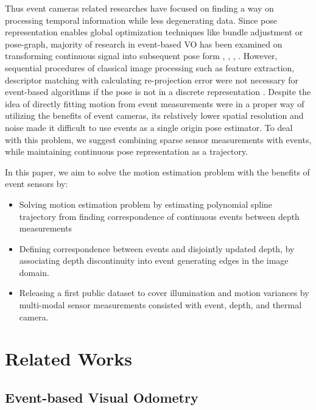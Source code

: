 Thus event cameras related researches have focused on finding a way on processing temporal information while less degenerating data. Since pose representation enables global optimization techniques like bundle adjustment or pose-graph, majority of research in event-based \ac{VO} has been examined on transforming continuous signal into subsequent pose form \cite{lagorce2015asynchronous}, \cite{clady2015asynchronous}, \cite{weikersdorfer2012event}, \cite{kim2016real}. However, sequential procedures of classical image processing such as feature extraction, descriptor matching with calculating re-projection error were not necessary for event-based algorithms if the pose is not in a discrete representation \cite{rebecq2017evo} \cite{vidal2018ultimate}. Despite the idea of directly fitting motion from event measurements were in a proper way of utilizing the benefits of event cameras, its relatively lower spatial resolution and noise made it difficult to use events as a single origin pose estimator. To deal with this problem, we suggest combining sparse sensor measurements with events, while maintaining continuous pose representation as a trajectory.

In this paper, we aim to solve the motion estimation problem with the benefits of event sensors by:
%

\begin{itemize}
	\item Solving motion estimation problem by estimating polynomial spline trajectory from finding correspondence of continuous events between depth measurements

	\item Defining correspondence between events and disjointly updated depth, by associating depth discontinuity into event generating edges in the image domain.
	
	\item Releasing a first public dataset to cover illumination and motion variances by multi-modal sensor
	measurements consisted with event, depth, and thermal camera.

\end{itemize}

\section{Related Works}
\label{sec:related}

\subsection{Event-based Visual Odometry}

